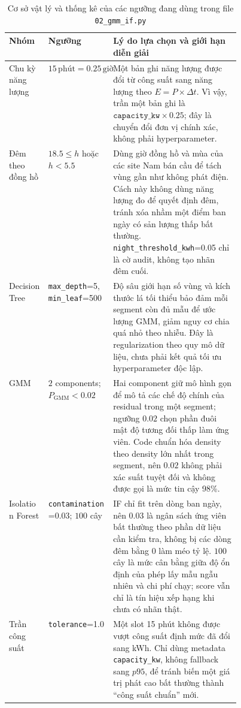 \documentclass[12pt,a4paper]{article}
\begin{document}
\begin{table}[htbp]
\centering
\caption{Cơ sở vật lý và thống kê của các ngưỡng đang dùng trong file \texttt{02\_gmm\_if.py}}
\label{tab:gmm_if_threshold_rationale}
\scriptsize
\setlength{\tabcolsep}{3pt}
\begin{tabularx}{\linewidth}{>{\raggedright\arraybackslash}p{0.17\linewidth} >{\raggedright\arraybackslash}p{0.28\linewidth} >{\raggedright\arraybackslash}X}
\toprule
\textbf{Nhóm} & \textbf{Ngưỡng} & \textbf{Lý do lựa chọn và giới hạn diễn giải} \\
\midrule
Chu kỳ năng lượng & $15\,\text{phút}=0.25\,\text{giờ}$ & Một bản ghi năng lượng được đổi từ công suất sang năng lượng theo $E=P\times\Delta t$. Vì vậy, trần một bản ghi là $\texttt{capacity\_kw}\times0.25$; đây là chuyển đổi đơn vị chính xác, không phải hyperparameter. \\
Đêm theo đồng hồ & $18.5\leq h$ hoặc $h<5.5$ & Dùng giờ đồng hồ và mùa của các site Nam bán cầu để tách vùng gần như không phát điện. Cách này không dùng năng lượng đo để quyết định đêm, tránh xóa nhầm một điểm ban ngày có sản lượng thấp bất thường. \texttt{night\_threshold\_kwh}=0.05 chỉ là cờ audit, không tạo nhãn đêm cuối. \\
Decision Tree & \texttt{max\_depth}=5, \texttt{min\_leaf}=500 & Độ sâu giới hạn số vùng và kích thước lá tối thiểu bảo đảm mỗi segment còn đủ mẫu để ước lượng GMM, giảm nguy cơ chia quá nhỏ theo nhiễu. Đây là regularization theo quy mô dữ liệu, chưa phải kết quả tối ưu hyperparameter độc lập. \\
GMM & $2$ components; $P_{\text{GMM}}<0.02$ & Hai component giữ mô hình gọn để mô tả các chế độ chính của residual trong một segment; ngưỡng $0.02$ chọn phần đuôi mật độ tương đối thấp làm ứng viên. Code chuẩn hóa density theo density lớn nhất trong segment, nên $0.02$ không phải xác suất tuyệt đối và không được gọi là mức tin cậy 98\%. \\
Isolation Forest & \texttt{contamination}=0.03; $100$ cây & IF chỉ fit trên dòng ban ngày, nên $0.03$ là ngân sách ứng viên bất thường theo phần dữ liệu cần kiểm tra, không bị các dòng đêm bằng 0 làm méo tỷ lệ. $100$ cây là mức cân bằng giữa độ ổn định của phép lấy mẫu ngẫu nhiên và chi phí chạy; score vẫn chỉ là tín hiệu xếp hạng khi chưa có nhãn thật. \\
Trần công suất & \texttt{tolerance}=1.0 & Một slot 15 phút không được vượt công suất định mức đã đổi sang kWh. Chỉ dùng metadata \texttt{capacity\_kw}, không fallback sang $p95$, để tránh biến một giá trị phát cao bất thường thành ``công suất chuẩn'' mới. \\

\end{tabularx}
\end{table}
\end{document}
